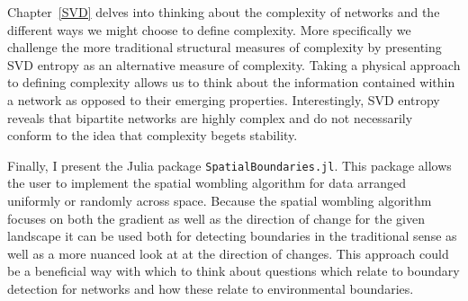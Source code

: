 \documentclass[12pt,twoside,phd]{dms}
\numberwithin{equation}{section}
\numberwithin{table}{chapter}
\numberwithin{figure}{chapter}
\begin{document}
Chapter~\ref{SVD} delves into thinking about the complexity of networks and the different ways we might choose to define complexity. More specifically we challenge the more traditional structural measures of complexity by presenting SVD entropy as an alternative measure of complexity. Taking a physical approach to defining complexity allows us to think about the information contained within a network as opposed to their emerging properties. Interestingly, SVD entropy reveals that bipartite networks are highly complex and do not necessarily conform to the idea that complexity begets stability. 

Finally, I present the Julia package \texttt{SpatialBoundaries.jl}. This package allows the user to implement the spatial wombling algorithm for data arranged uniformly or randomly across space. Because the spatial wombling algorithm focuses on both the gradient as well as the direction of change for the given landscape it can be used both for detecting boundaries in the traditional sense as well as a more nuanced look at at the direction of changes. This approach could be a beneficial way with which to think about questions which relate to boundary detection for networks and how these relate to environmental boundaries.



\anglais
\cleardoublepage
{}  %
\tableofcontents
\cleardoublepage
{}  %
\listoftables
\cleardoublepage
{}
\listoffigures
\end{document}
